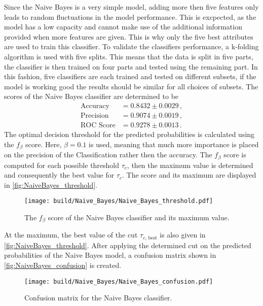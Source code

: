 Since the Naive Bayes is a very simple model, adding more then five features only leads to random
fluctuations in the model performance. This is excpected, as the model has a low capacity and
cannot make use of the additional information provided when more features are given.
This is why only the five best attributes are used to train this classifier.
To validate the classifiers performance, a k-folding algorithm is used with five splits.
This means that the data is split in five parts, the classifier is then trained on four parts and tested using
the remaining part. In this fashion, five classifiers are each trained and tested on different subsets,
if the model is working good the results should be similar for all choices of subsets.
The scores of the Naive Bayes classifier are determined to be
\begin{align*}
  \text{Accuracy} &= 0.8432\pm0.0029 \,, \\
  \text{Precision} &= 0.9074\pm0.0019 \,, \\
  \text{ROC Score} &= 0.9278\pm0.0013 \,.
\end{align*}
The optimal decision threshold for the predicted probabilities is calculated using
the $f_\beta$ score. Here, $\beta=0.1$ is used, meaning that much more importance
is placed on the precision of the Classification rather then the accuracy.
The $f_\beta$ score is computed for each possible threshold $\tau_c$, then
the maximum value is determined and consequently the best value for $\tau_c$.
The score and its maximum are displayed in \autoref{fig:NaiveBayes_threshold}.

\begin{figure}[H]
  \centering
  \texttt{[image: build/Naive\_Bayes/Naive\_Bayes\_threshold.pdf]}
  \caption{The $f_\beta$ score of the Naive Bayes classifier and its maximum value.}
  \label{fig:NaiveBayes_threshold}
\end{figure}

At the maximum, the best value of the cut $\tau_{c \text{, best}}$ is also given in \autoref{fig:NaiveBayes_threshold}.
After applying the determined cut on the predicted probabilities of the Naive Bayes model,
a confusion matrix shown in \autoref{fig:NaiveBayes_confusion} is created.

\begin{figure}[H]
  \centering
  \texttt{[image: build/Naive\_Bayes/Naive\_Bayes\_confusion.pdf]}
  \caption{Confusion matrix for the Naive Bayes classifier.}
  \label{fig:NaiveBayes_confusion}
\end{figure}

